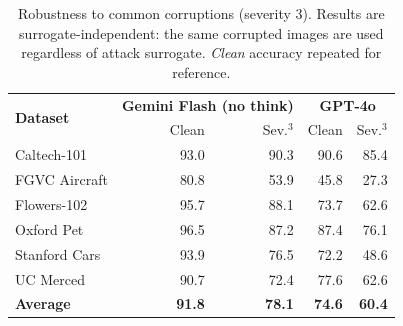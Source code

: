 \begin{table}[t]
\centering
\setlength{\tabcolsep}{5pt}
\renewcommand{\arraystretch}{1.08}
\small
\caption{%
  Robustness to common corruptions (severity 3).
  Results are surrogate-independent: the same corrupted images
  are used regardless of attack surrogate.
  \emph{Clean} accuracy repeated for reference.
}
\label{tab:common}
\begin{tabular}{l || r r || r r}
\toprule
\multirow{2}{*}{\textbf{Dataset}} & \multicolumn{2}{c||}{\textbf{Gemini Flash (no think)}} & \multicolumn{2}{c}{\textbf{GPT-4o}} \\
 & Clean & Sev.$^3$ & Clean & Sev.$^3$ \\
\midrule
Caltech-101 & 93.0 & 90.3 & 90.6 & 85.4 \\
FGVC Aircraft & 80.8 & 53.9 & 45.8 & 27.3 \\
Flowers-102 & 95.7 & 88.1 & 73.7 & 62.6 \\
Oxford Pet & 96.5 & 87.2 & 87.4 & 76.1 \\
Stanford Cars & 93.9 & 76.5 & 72.2 & 48.6 \\
UC Merced & 90.7 & 72.4 & 77.6 & 62.6 \\
\midrule
\textbf{Average} & \textbf{91.8} & \textbf{78.1} & \textbf{74.6} & \textbf{60.4} \\
\bottomrule
\end{tabular}
\end{table}